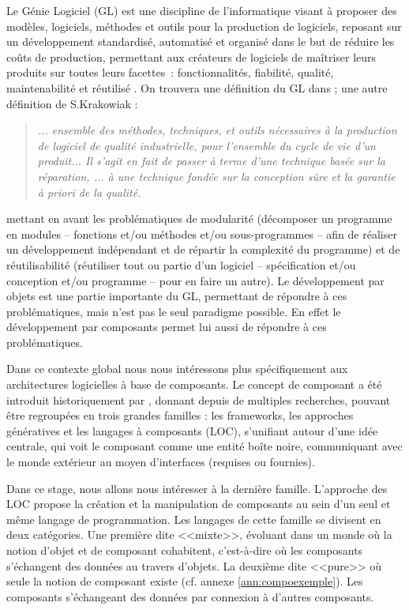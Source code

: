   
  Le Génie Logiciel (GL) est une discipline de l'informatique visant à proposer des modèles, logiciels, méthodes et outils pour la production de logiciels, reposant sur un développement standardisé, automatisé et organisé dans le but de réduire les coûts de production, permettant aux créateurs de logiciels de maîtriser leurs produits sur toutes leurs facettes~: fonctionnalités, fiabilité, qualité, maintenabilité et réutilisé \cite{dony1989langages}. On trouvera une définition du GL dans \cite{Boehm:1976:SE:1311958.1312684}; une autre définition de S.Krakowiak : 
 
   \begin{quote}
      \emph{ ... ensemble des méthodes, techniques, et outils nécessaires à la
production de logiciel de qualité industrielle, pour l'ensemble du cycle
de vie d'un produit... Il s'agit en fait de passer à terme d'une technique
basée sur la réparation, ... à une technique fondée sur la conception sûre
et la garantie à priori de la qualité.} 
  \end{quote}

  mettant en avant les problématiques de modularité (décomposer un programme en modules -- fonctions et/ou méthodes et/ou sous-programmes -- afin de réaliser un développement indépendant et de répartir la complexité du programme) et de réutilisa\-bilité (réutiliser tout ou partie d'un logiciel -- spécification et/ou conception et/ou programme -- pour en faire un autre). Le développement par objets est une partie importante du GL, permettant de répondre à ces problématiques, mais n'est pas le seul paradigme possible.  En effet le développement par composants permet lui aussi de répondre à ces problématiques.\\\par
  
  Dans ce contexte global nous nous intéressons plus spécifiquement aux architectures logicielles à base de composants.
  Le concept de composant a été introduit historiquement par \cite{Il68}, donnant depuis de multiples recherches, pouvant être regroupées en trois grandes familles : les frameworks, les approches génératives et les langages à composants (LOC), s'unifiant autour d'une idée centrale, qui voit le composant comme une entité boîte noire, communiquant avec le monde extérieur au moyen d'interfaces (requises ou fournies). \\\par
  
  Dans ce stage, nous allons nous intéresser à la dernière famille. L'approche des LOC propose la création et la manipulation de composants au sein d'un seul et même langage de programmation. Les langages de cette famille se divisent en deux catégories. Une première dite <<mixte>>, évoluant dans un monde où la notion d'objet et de composant cohabitent, c'est-à-dire où les composants s'échangent des données au travers d'objets. La deuxième dite <<pure>> où seule la notion de composant existe (cf. annexe \ref{ann:compoexemple}). Les composants s'échangeant des données par connexion à d'autres composants. \\\par
  
